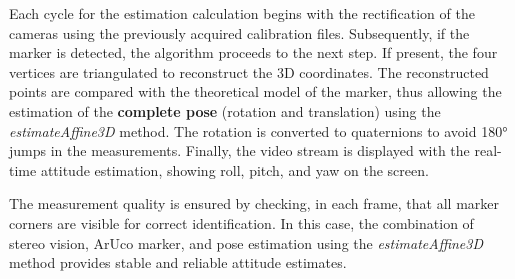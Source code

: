 Each cycle for the estimation calculation begins with the rectification of the cameras using the previously acquired calibration files. Subsequently, if the marker is detected, the algorithm proceeds to the next step. If present, the four vertices are triangulated to reconstruct the 3D coordinates. The reconstructed points are compared with the theoretical model of the marker, thus allowing the estimation of the \textbf{complete pose} (rotation and translation) using the \textit{estimateAffine3D} method. The rotation is converted to quaternions to avoid 180° jumps in the measurements. Finally, the video stream is displayed with the real-time attitude estimation, showing roll, pitch, and yaw on the screen.

The measurement quality is ensured by checking, in each frame, that all marker corners are visible for correct identification. In this case, the combination of stereo vision, ArUco marker, and pose estimation using the \textit{estimateAffine3D} method provides stable and reliable attitude estimates.
